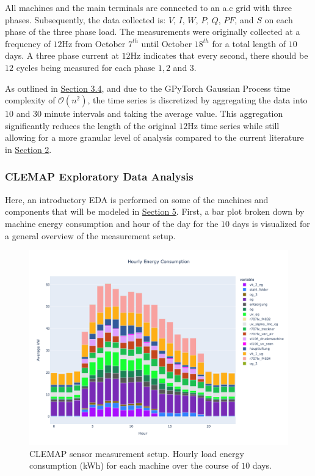 All machines and the main terminals are connected to an \ac{a.c} grid with three phases. Subsequently, the data collected is: $V$, $I$, $W$, $P$, $Q$, $PF$, and $S$ on each phase of the three phase load. The measurements were originally collected at a frequency of $12$Hz from October $7^{th}$ until October $18^{th}$ for a total length of $10$ days. A three phase current at $12$Hz indicates that every second, there should be $12$ cycles being measured for each phase $1, 2$ and $3$. 

As outlined in \hyperlink{subsection.3.4}{Section 3.4}, and due to the GPyTorch Gaussian Process time complexity of $\mathcal{O}(n^2)$, the time series is discretized by aggregating the data into $10$ and $30$ minute intervals and taking the average value. This aggregation significantly reduces the length of the original $12$Hz time series while still allowing for a more granular level of analysis compared to the current literature in \hyperlink{section.2}{Section 2}.

\subsubsection{CLEMAP Exploratory Data Analysis}

Here, an introductory EDA is performed on some of the machines and components that will be modeled in \hyperlink{section.5}{Section 5}. First, a bar plot broken down by machine energy consumption and hour of the day for the $10$ days is visualized for a general overview of the measurement setup.

\begin{figure}[htp]
\centering
\graphicspath{ {./images/} }
\includegraphics[scale=0.47]{images/hourly_load_barplot.png}
\caption{CLEMAP sensor measurement setup. Hourly load energy consumption (kWh) for each machine over the course of $10$ days.}
\label{fig:fig6}
\end{figure}

